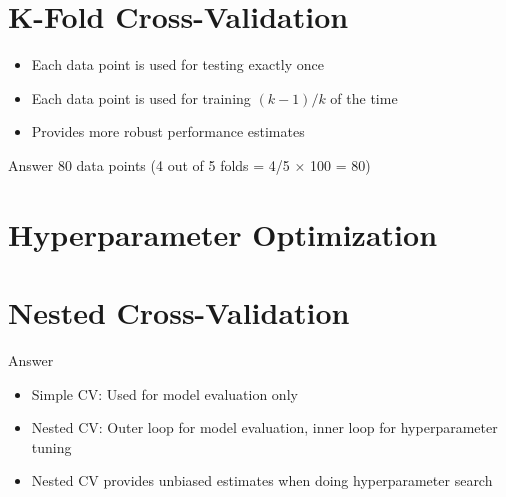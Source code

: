 \documentclass[usenames,dvipsnames]{beamer}
\begin{document}
\section{K-Fold Cross-Validation}

\begin{frame}\begin{itemize}
\item Each data point is used for testing exactly once
	\item Each data point is used for training $(k-1)/k$ of the time
	\pause
\item Provides more robust performance estimates
\end{itemize}
\end{frame}

\begin{frame}\begin{block}{Answer}
80 data points (4 out of 5 folds = 4/5 × 100 = 80)
\end{block}
\end{frame}

\section{Hyperparameter Optimization}


\section{Nested Cross-Validation}


\begin{frame}\begin{block}{Answer}
\begin{itemize}
\item Simple CV: Used for model evaluation only
	\item Nested CV: Outer loop for model evaluation, inner loop for hyperparameter tuning
	\pause
\item Nested CV provides unbiased estimates when doing hyperparameter search
\end{itemize}
\end{block}
\end{frame}
\end{document}
